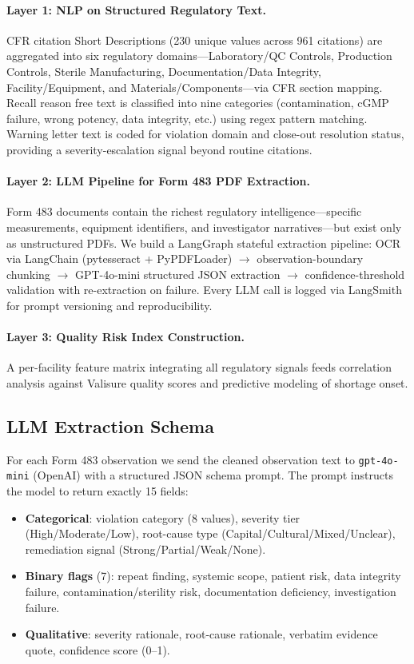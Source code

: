 \documentclass[12pt]{article}
\begin{document}
\paragraph{Layer 1: NLP on Structured Regulatory Text.}
CFR citation Short Descriptions (230 unique values across 961 citations) are
aggregated into six regulatory domains---Laboratory/QC Controls, Production
Controls, Sterile Manufacturing, Documentation/Data Integrity,
Facility/Equipment, and Materials/Components---via CFR section mapping.
Recall reason free text is classified into nine categories (contamination,
cGMP failure, wrong potency, data integrity, etc.) using regex pattern matching.
Warning letter text is coded for violation domain and close-out resolution
status, providing a severity-escalation signal beyond routine citations.

\paragraph{Layer 2: LLM Pipeline for Form 483 PDF Extraction.}
Form 483 documents contain the richest regulatory intelligence---specific
measurements, equipment identifiers, and investigator narratives---but exist
only as unstructured PDFs.
We build a LangGraph stateful extraction pipeline: OCR via LangChain
(pytesseract + PyPDFLoader) $\to$ observation-boundary chunking $\to$
GPT-4o-mini structured JSON extraction $\to$ confidence-threshold validation
with re-extraction on failure.
Every LLM call is logged via LangSmith for prompt versioning and reproducibility.

\paragraph{Layer 3: Quality Risk Index Construction.}
A per-facility feature matrix integrating all regulatory signals feeds
correlation analysis against Valisure quality scores and predictive modeling
of shortage onset.

\subsection{LLM Extraction Schema}

For each Form 483 observation we send the cleaned observation text to
\texttt{gpt-4o-mini} (OpenAI) with a structured JSON schema prompt.
The prompt instructs the model to return exactly 15 fields:

\begin{itemize}[noitemsep]
  \item \textbf{Categorical}: violation category (8 values), severity tier
        (High/Moderate/Low), root-cause type (Capital/Cultural/Mixed/Unclear),
        remediation signal (Strong/Partial/Weak/None).
  \item \textbf{Binary flags} (7): repeat finding, systemic scope, patient
        risk, data integrity failure, contamination/sterility risk,
        documentation deficiency, investigation failure.
  \item \textbf{Qualitative}: severity rationale, root-cause rationale,
        verbatim evidence quote, confidence score (0--1).
\end{itemize}
\end{document}
